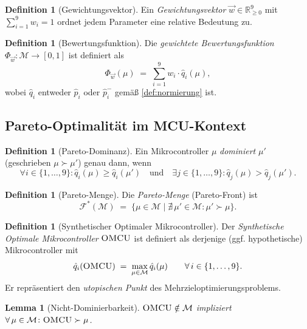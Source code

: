 ﻿\documentclass[12pt, a4paper]{article}
\theoremstyle{plain}
\newtheorem{lemma}[theorem]{Lemma}
\theoremstyle{definition}
\newtheorem{definition}[theorem]{Definition}
\theoremstyle{remark}
\newcommand{\omcu}{\textsc{OMCU}}
\newcommand{\RR}{\mathbb{R}}
\begin{document}
\begin{definition}[Gewichtungsvektor]
\label{def:gewichtung}
  Ein \emph{Gewichtungsvektor} $\vec{w} \in \RR_{\ge 0}^9$ mit
  $\sum_{i=1}^{9} w_i = 1$ ordnet jedem Parameter eine relative Bedeutung zu.
\end{definition}

\begin{definition}[Bewertungsfunktion]
\label{def:bewertung}
  Die \emph{gewichtete Bewertungsfunktion} $\Phi_{\vec{w}} \colon
  \mathcal{M} \to [0,1]$ ist definiert als
  \[
    \Phi_{\vec{w}}(\mu) \;=\;
    \sum_{i=1}^{9} w_i \cdot \hat{q}_i(\mu),
  \]
  wobei $\hat{q}_i$ entweder $\hat{p}_i$ oder $\hat{p}_i^{-}$ gemäß
  \cref{def:normierung} ist.
\end{definition}

\subsection{Pareto-Optimalität im MCU-Kontext}

\begin{definition}[Pareto-Dominanz]
\label{def:pareto-dominanz}
  Ein Mikrocontroller $\mu$ \emph{dominiert} $\mu'$ (geschrieben
  $\mu \succ \mu'$) genau dann, wenn
  \[
    \forall i \in \{1,\ldots,9\} \colon \hat{q}_i(\mu) \ge \hat{q}_i(\mu')
    \quad\text{und}\quad
    \exists j \in \{1,\ldots,9\} \colon \hat{q}_j(\mu) > \hat{q}_j(\mu').
  \]
\end{definition}

\begin{definition}[Pareto-Menge]
\label{def:pareto-menge}
  Die \emph{Pareto-Menge} (Pareto-Front) ist
  \[
    \mathcal{F}^*(\mathcal{M}) \;=\;
    \bigl\{ \mu \in \mathcal{M} \;\big|\;
    \nexists\, \mu' \in \mathcal{M} \colon \mu' \succ \mu \bigr\}.
  \]
\end{definition}

\begin{definition}[Synthetischer Optimaler Mikrocontroller]
\label{def:omcu}
  Der \emph{Synthetische Optimale Mikrocontroller} $\omcu{}$ ist definiert als
  derjenige (ggf. hypothetische) Mikrocontroller mit
  \[
    \hat{q}_i(\omcu{}) \;=\; \max_{\mu \in \mathcal{M}} \hat{q}_i(\mu)
    \qquad \forall\, i \in \{1,\ldots,9\}.
  \]
  Er repräsentiert den \emph{utopischen Punkt} des
  Mehrzieloptimierungsproblems.
\end{definition}

\begin{lemma}[Nicht-Dominierbarkeit]
\label{lem:nicht-dominierbar}
  $\omcu{} \notin \mathcal{M}$ impliziert
  $\forall\, \mu \in \mathcal{M} \colon \omcu{} \succ \mu$.
\end{lemma}
\end{document}
